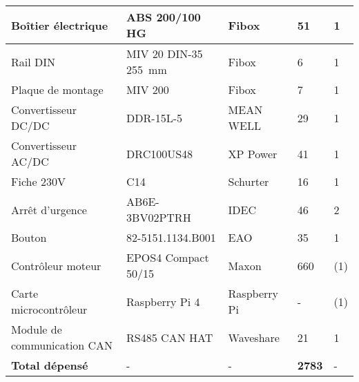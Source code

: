 \begin{table}[H]
{\begin{tabular}{|l|l|l|l|l|}
      Boîtier électrique          & ABS 200/100 HG                   & Fibox \cite{Fibox}              & 51                         & 1                 \\ \hline
      Rail DIN                    & MIV 20 DIN-35 255~mm             & Fibox \cite{Fibox}              & 6                          & 1                 \\ \hline
      Plaque de montage           & MIV 200                          & Fibox \cite{Fibox}              & 7                          & 1                 \\ \hline
      Convertisseur DC/DC         & DDR-15L-5                        & MEAN WELL \cite{MEANWELL}       & 29                         & 1                 \\ \hline
      Convertisseur AC/DC         & DRC100US48                       & XP Power \cite{XPPower}         & 41                         & 1                 \\ \hline
      Fiche 230V                  & C14                              & Schurter \cite{Schurter}        & 16                         & 1                 \\ \hline
      Arrêt d'urgence             & AB6E-3BV02PTRH                   & IDEC \cite{IDEC}                & 46                         & 2                 \\ \hline
      Bouton                      & 82-5151.1134.B001                & EAO \cite{EAO}                  & 35                         & 1                 \\ \hline
      Contrôleur moteur           & EPOS4 Compact 50/15              & Maxon \cite{Maxon}              & 660                        & (1)               \\ \hline
      Carte microcontrôleur       & Raspberry Pi 4                   & Raspberry Pi \cite{RaspberryPi} & -                          & (1)               \\ \hline
      Module de communication CAN & RS485 CAN HAT                    & Waveshare \cite{Waveshare}      & 21                         & 1                 \\ \hline
      \textbf{Total dépensé}      & -                                & -                               & \textbf{2783}\footnotemark & -                 \\ \hline
    \end{tabular}%
  }
\end{table}


